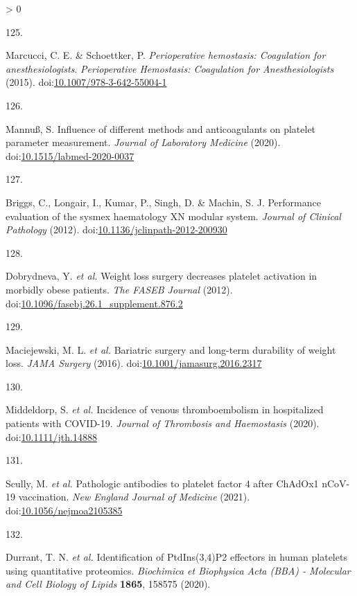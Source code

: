 \documentclass[11pt,twoside]{bristolthesis}
\newlength{\cslhangindent}
\newlength{\csllabelwidth}
\newenvironment{CSLReferences}[2] %
 {%
  \setlength{\parindent}{0pt}
  \ifodd #1 \everypar{\setlength{\hangindent}{\cslhangindent}}\ignorespaces\fi
  \ifnum #2 > 0
  \setlength{\parskip}{#2\baselineskip}
  \fi
 }%
 {}
\newcommand{\CSLLeftMargin}[1]{\parbox[t]{\csllabelwidth}{#1}}
\newcommand{\CSLRightInline}[1]{\parbox[t]{\linewidth - \csllabelwidth}{#1}\break}
\begin{document}
\begin{CSLReferences}{0}{0}
\leavevmode\hypertarget{ref-Marcucci2015}{}%
\CSLLeftMargin{125. }
\CSLRightInline{Marcucci, C. E. \& Schoettker, P. \emph{Perioperative hemostasis: Coagulation for anesthesiologists}. \emph{Perioperative Hemostasis: Coagulation for Anesthesiologists} (2015). doi:\href{https://doi.org/10.1007/978-3-642-55004-1}{10.1007/978-3-642-55004-1}}

\leavevmode\hypertarget{ref-Mannuuxdf2020}{}%
\CSLLeftMargin{126. }
\CSLRightInline{Mannuß, S. Influence of different methods and anticoagulants on platelet parameter measurement. \emph{Journal of Laboratory Medicine} (2020). doi:\href{https://doi.org/10.1515/labmed-2020-0037}{10.1515/labmed-2020-0037}}

\leavevmode\hypertarget{ref-Briggs2012}{}%
\CSLLeftMargin{127. }
\CSLRightInline{Briggs, C., Longair, I., Kumar, P., Singh, D. \& Machin, S. J. Performance evaluation of the sysmex haematology XN modular system. \emph{Journal of Clinical Pathology} (2012). doi:\href{https://doi.org/10.1136/jclinpath-2012-200930}{10.1136/jclinpath-2012-200930}}

\leavevmode\hypertarget{ref-Dobrydneva2012}{}%
\CSLLeftMargin{128. }
\CSLRightInline{Dobrydneva, Y. \emph{et al.} Weight loss surgery decreases platelet activation in morbidly obese patients. \emph{The FASEB Journal} (2012). doi:\href{https://doi.org/10.1096/fasebj.26.1_supplement.876.2}{10.1096/fasebj.26.1\_supplement.876.2}}

\leavevmode\hypertarget{ref-Maciejewski2016}{}%
\CSLLeftMargin{129. }
\CSLRightInline{Maciejewski, M. L. \emph{et al.} Bariatric surgery and long-term durability of weight loss. \emph{JAMA Surgery} (2016). doi:\href{https://doi.org/10.1001/jamasurg.2016.2317}{10.1001/jamasurg.2016.2317}}

\leavevmode\hypertarget{ref-Middeldorp2020}{}%
\CSLLeftMargin{130. }
\CSLRightInline{Middeldorp, S. \emph{et al.} Incidence of venous thromboembolism in hospitalized patients with COVID-19. \emph{Journal of Thrombosis and Haemostasis} (2020). doi:\href{https://doi.org/10.1111/jth.14888}{10.1111/jth.14888}}

\leavevmode\hypertarget{ref-Scully2021}{}%
\CSLLeftMargin{131. }
\CSLRightInline{Scully, M. \emph{et al.} Pathologic antibodies to platelet factor 4 after ChAdOx1 nCoV-19 vaccination. \emph{New England Journal of Medicine} (2021). doi:\href{https://doi.org/10.1056/nejmoa2105385}{10.1056/nejmoa2105385}}

\leavevmode\hypertarget{ref-Durrant2020}{}%
\CSLLeftMargin{132. }
\CSLRightInline{Durrant, T. N. \emph{et al.} Identification of PtdIns(3,4)P2 effectors in human platelets using quantitative proteomics. \emph{Biochimica et Biophysica Acta (BBA) - Molecular and Cell Biology of Lipids} \textbf{1865}, 158575 (2020).}


\end{CSLReferences}
\end{document}
